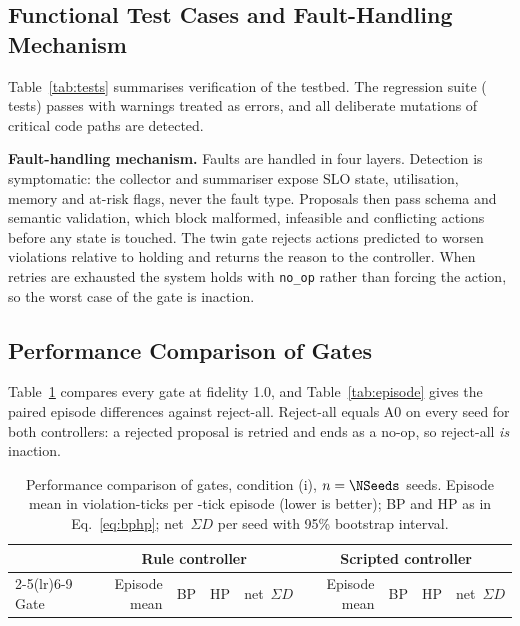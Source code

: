 \documentclass[conference]{IEEEtran}
\newcommand{\netSD}{net~$\Sigma D$}
\begin{document}
\subsection{Functional Test Cases and Fault-Handling Mechanism}

Table~\ref{tab:tests} summarises verification of the testbed. The regression suite (\TestsPassed{} tests) passes with warnings treated as errors, and all \MutationsKilled{} deliberate mutations of critical code paths are detected.


\textbf{Fault-handling mechanism.} Faults are handled in four layers. Detection is symptomatic: the collector and summariser expose SLO state, utilisation, memory and at-risk flags, never the fault type. Proposals then pass schema and semantic validation, which block malformed, infeasible and conflicting actions before any state is touched. The twin gate rejects actions predicted to worsen violations relative to holding and returns the reason to the controller. When retries are exhausted the system holds with \texttt{no\_op} rather than forcing the action, so the worst case of the gate is inaction.

\subsection{Performance Comparison of Gates}

Table~\ref{tab:gates} compares every gate at fidelity 1.0, and Table~\ref{tab:episode} gives the paired episode differences against reject-all. Reject-all equals A0 on every seed for both controllers: a rejected proposal is retried and ends as a no-op, so reject-all \emph{is} inaction.

\begin{table}[t]
\centering
\caption{Performance comparison of gates, condition (i), $n=\NSeeds$ seeds. Episode mean in violation-ticks per \EpisodeTicks-tick episode (lower is better); BP and HP as in Eq.~\eqref{eq:bphp}; \netSD{} per seed with 95\% bootstrap interval.}
\label{tab:gates}
\footnotesize
\setlength{\tabcolsep}{4pt}
\begin{tabular}{@{}lrrrlrrrl@{}}
\toprule
& \multicolumn{4}{c}{Rule controller} & \multicolumn{4}{c}{Scripted controller} \\
\cmidrule(lr){2-5}\cmidrule(lr){6-9}
Gate & Episode mean & BP & HP & \netSD{} & Episode mean & BP & HP & \netSD{} \\
\midrule
\bottomrule
\end{tabular}
\end{table}
\end{document}
